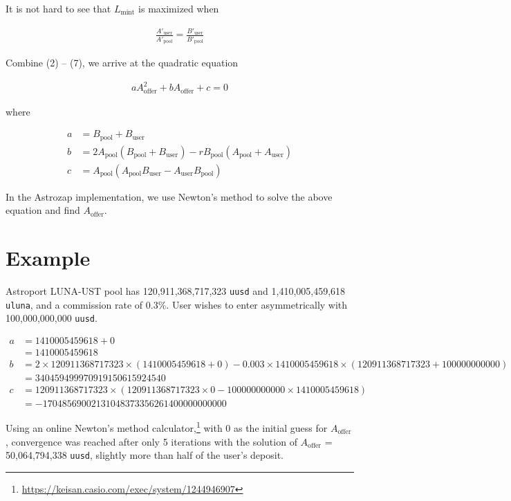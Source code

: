 \documentclass{article}
\begin{document}
It is not hard to see that $L_{\mathrm{mint}}$ is maximized when

\begin{align}
\frac{A'_{\mathrm{user}}}{A'_{\mathrm{pool}}} = \frac{B'_{\mathrm{user}}}{B'_{\mathrm{pool}}}
\end{align}

Combine (2) -- (7), we arrive at the quadratic equation

\begin{align}
a A^2_{\mathrm{offer}} + b A_{\mathrm{offer}} + c = 0
\end{align}

where

\begin{align}
a &= B_{\mathrm{pool}} + B_{\mathrm{user}} \\
b &= 2 A_{\mathrm{pool}} (B_{\mathrm{pool}} + B_{\mathrm{user}}) - r B_{\mathrm{pool}} (A_{\mathrm{pool}} + A_{\mathrm{user}}) \\
c &= A_{\mathrm{pool}} (A_{\mathrm{pool}} B_{\mathrm{user}} - A_{\mathrm{user}} B_{\mathrm{pool}})
\end{align}

In the Astrozap implementation, we use Newton's method to solve the above equation and find $A_{\mathrm{offer}}$.

\section{Example}

Astroport LUNA-UST pool has 120,911,368,717,323 \texttt{uusd} and 1,410,005,459,618 \texttt{uluna}, and a commission rate of 0.3\%. User wishes to enter asymmetrically with 100,000,000,000 \texttt{uusd}.

\begin{align*}
a &= 1410005459618 + 0 \\
  &= 1410005459618 \\
b &= 2 \times 120911368717323 \times (1410005459618 + 0) - 0.003 \times 1410005459618 \times (120911368717323 + 100000000000) \\
  &= 340459499970919150615924540 \\
c &= 120911368717323 \times (120911368717323 \times 0 - 100000000000 \times 1410005459618) \\
  &= -17048569002131048373356261400000000000
\end{align*}

Using an online Newton's method calculator,\footnote{\url{https://keisan.casio.com/exec/system/1244946907}} with 0 as the initial guess for $A_{\mathrm{offer}}$, convergence was reached after only 5 iterations with the solution of $A_{\mathrm{offer}}$ = 50,064,794,338 \texttt{uusd}, slightly more than half of the user's deposit.
\end{document}

